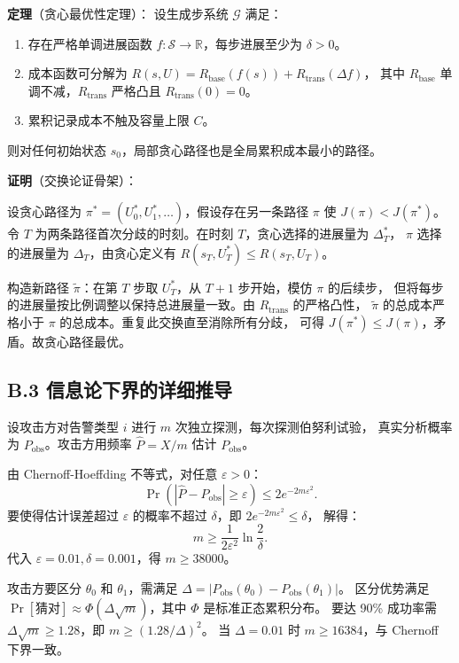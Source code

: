 \documentclass[11pt,a4paper]{article}
\begin{document}
\textbf{定理}（贪心最优性定理）：
设生成步系统 $\mathcal{G}$ 满足：
\begin{enumerate}[label=(C\arabic*)]
    \item 存在严格单调进展函数 $f: \mathcal{S} \to \mathbb{R}$，每步进展至少为 $\delta > 0$。
    \item 成本函数可分解为 $R(s,U) = R_{\text{base}}(f(s)) + R_{\text{trans}}(\Delta f)$，
          其中 $R_{\text{base}}$ 单调不减，$R_{\text{trans}}$ 严格凸且 $R_{\text{trans}}(0)=0$。
    \item 累积记录成本不触及容量上限 $C$。
\end{enumerate}
则对任何初始状态 $s_0$，局部贪心路径也是全局累积成本最小的路径。

\textbf{证明}（交换论证骨架）：

设贪心路径为 $\pi^* = (U_0^*, U_1^*, \ldots)$，假设存在另一条路径 $\pi$ 使 $J(\pi) < J(\pi^*)$。
令 $T$ 为两条路径首次分歧的时刻。在时刻 $T$，贪心选择的进展量为 $\Delta_T^*$，
$\pi$ 选择的进展量为 $\Delta_T$，由贪心定义有 $R(s_T, U_T^*) \le R(s_T, U_T)$。

构造新路径 $\tilde{\pi}$：在第 $T$ 步取 $U_T^*$，从 $T+1$ 步开始，模仿 $\pi$ 的后续步，
但将每步的进展量按比例调整以保持总进展量一致。由 $R_{\text{trans}}$ 的严格凸性，
$\tilde{\pi}$ 的总成本严格小于 $\pi$ 的总成本。重复此交换直至消除所有分歧，
可得 $J(\pi^*) \le J(\pi)$，矛盾。故贪心路径最优。

\subsection{B.3 信息论下界的详细推导}

设攻击方对告警类型 $i$ 进行 $m$ 次独立探测，每次探测伯努利试验，
真实分析概率为 $P_{\text{obs}}$。攻击方用频率 $\hat{P} = X/m$ 估计 $P_{\text{obs}}$。

由 Chernoff-Hoeffding 不等式，对任意 $\varepsilon > 0$：
\[
\Pr\left(|\hat{P} - P_{\text{obs}}| \ge \varepsilon\right) \le 2e^{-2m\varepsilon^2}.
\]
要使得估计误差超过 $\varepsilon$ 的概率不超过 $\delta$，即 $2e^{-2m\varepsilon^2} \le \delta$，
解得：
\[
m \ge \frac{1}{2\varepsilon^2} \ln\frac{2}{\delta}.
\]
代入 $\varepsilon = 0.01, \delta = 0.001$，得 $m \ge 38000$。

攻击方要区分 $\theta_0$ 和 $\theta_1$，需满足 $\Delta = |P_{\text{obs}}(\theta_0) - P_{\text{obs}}(\theta_1)|$。
区分优势满足 $\Pr[\text{猜对}] \approx \Phi(\Delta\sqrt{m})$，其中 $\Phi$ 是标准正态累积分布。
要达 90\% 成功率需 $\Delta\sqrt{m} \ge 1.28$，即 $m \ge (1.28/\Delta)^2$。
当 $\Delta = 0.01$ 时 $m \ge 16384$，与 Chernoff 下界一致。
\end{document}
